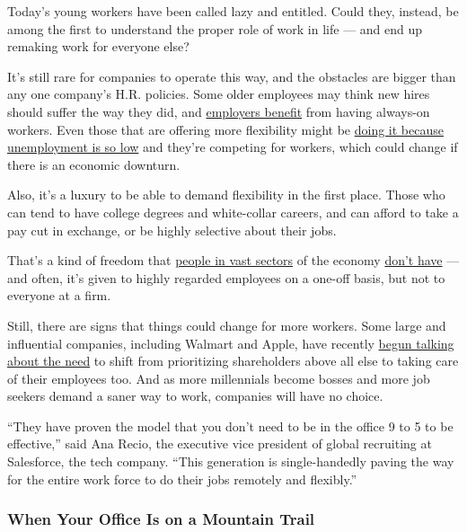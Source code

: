 Today's young workers have been called lazy and entitled. Could they,
instead, be among the first to understand the proper role of work in
life --- and end up remaking work for everyone else?

It's still rare for companies to operate this way, and the obstacles are
bigger than any one company's H.R. policies. Some older employees may
think new hires should suffer the way they did, and
\href{https://www.nytimes.com/2015/05/31/upshot/the-24-7-work-cultures-toll-on-families-and-gender-equality.html}{employers
benefit} from having always-on workers. Even those that are offering
more flexibility might be
\href{https://www.nytimes.com/2019/05/15/upshot/employers-flexible-work-america.html}{doing
it because unemployment is so low} and they're competing for workers,
which could change if there is an economic downturn.

Also, it's a luxury to be able to demand flexibility in the first place.
Those who can tend to have college degrees and white-collar careers, and
can afford to take a pay cut in exchange, or be highly selective about
their jobs.

That's a kind of freedom that
\href{https://www.nytimes.com/2019/09/01/opinion/working-two-jobs.html}{people
in vast sectors} of the economy
\href{https://www.nytimes.com/interactive/2014/08/13/us/starbucks-workers-scheduling-hours.html}{don't
have} --- and often, it's given to highly regarded employees on a
one-off basis, but not to everyone at a firm.

Still, there are signs that things could change for more workers. Some
large and influential companies, including Walmart and Apple, have
recently
\href{https://www.nytimes.com/2019/08/20/business/dealbook/business-roundtable-corporate-responsibility.html}{begun
talking about the need} to shift from prioritizing shareholders above
all else to taking care of their employees too. And as more millennials
become bosses and more job seekers demand a saner way to work, companies
will have no choice.

``They have proven the model that you don't need to be in the office 9
to 5 to be effective,'' said Ana Recio, the executive vice president of
global recruiting at Salesforce, the tech company. ``This generation is
single-handedly paving the way for the entire work force to do their
jobs remotely and flexibly.''

\hypertarget{when-your-office-is-on-a-mountain-trail}{%
\subsubsection{When Your Office Is on a Mountain
Trail}\label{when-your-office-is-on-a-mountain-trail}}

